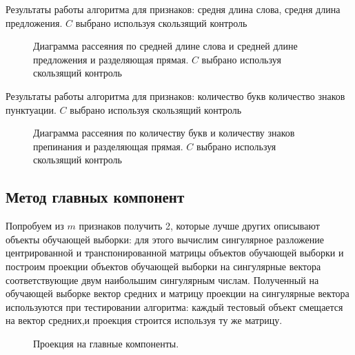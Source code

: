\documentclass[%
bachelor,    %
subf,        %
href,        %
colorlinks,  %
]{disser}
\begin{document}
\newpage
\begin{center}
	\begin{table}{}
		\centering
		\caption{Результаты работы алгоритма для признаков: средня длина слова, средня длина предложения. $C$ выбрано используя скользящий контроль}
		
		\label{table:learn_3_cv_tr}	
	\end{table}		
	\begin{figure}[t!]
		\centering		
		
		\caption{Диаграмма рассеяния по средней длине слова и средней длине предложения и разделяющая прямая. $C$ выбрано используя скользящий контроль}
		\label{fig:learn_3_cv}
	\end{figure}
\end{center}
\newpage
\begin{center}
	\begin{table}{}
		\centering	
		\caption{Результаты работы алгоритма для признаков: количество букв количество знаков пунктуации. $C$ выбрано используя скользящий контроль}	
			
		\label{table:learn_4_cv_tr}
	\end{table}
	\begin{figure}[t!]
		\centering		
		
		\caption{Диаграмма рассеяния по количеству букв и количеству знаков препинания и разделяющая прямая. $C$ выбрано используя скользящий контроль }
		\label{fig:learn_4_cv}
	\end{figure}
\end{center}
\newpage
\subsection{Метод главных компонент}
Попробуем из $m$ признаков получить 2, которые лучше других описывают объекты обучающей выборки:
для этого вычислим сингулярное разложение центрированной и транспонированной матрицы объектов обучающей выборки и построим проекции объектов обучающей выборки на сингулярные вектора соответствующие двум наибольшим сингулярным числам.\cite{ssa}
Полученный на обучающей выборке вектор средних и матрицу проекции на сингулярные вектора используются при тестировании алгоритма: каждый тестовый объект смещается на вектор средних,и проекция строится используя ту же матрицу.
\begin{figure}
	\centering		
	
	\caption{Проекция на главные компоненты.}
	\label{fig:scatter_5}
\end{figure}
\end{document}

